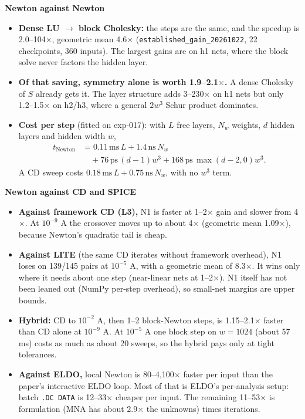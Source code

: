 \documentclass[11pt,a4paper]{article}
\begin{document}
\textbf{Newton against Newton}

\begin{itemize}
\item \textbf{Dense LU \ensuremath{\to} block Cholesky:} the steps are the same, and the
speedup is 2.0--104\ensuremath{\times}, geometric mean 4.6\ensuremath{\times}
(\nolinkurl{established_gain_20261022}, 22 checkpoints, 360 inputs). The largest gains
are on h1 nets, where the block solve never factors the hidden layer.
\item \textbf{Of that saving, symmetry alone is worth 1.9--2.1\ensuremath{\times}.} A dense
Cholesky of $S$ already gets it. The layer structure adds 3--230\ensuremath{\times} on
h1 nets but only 1.2--1.5\ensuremath{\times} on h2/h3, where a general $2w^3$ Schur
product dominates.
\item \textbf{Cost per step} (fitted on exp-017): with $L$ free layers,
$N_w$ weights, $d$ hidden layers and hidden width $w$,
\[
\begin{aligned}
t_{\mathrm{Newton}}
&=0.11\,\mathrm{ms}\,L+1.4\,\mathrm{ns}\,N_w\\
&\quad+76\,\mathrm{ps}\,(d-1)w^3
+168\,\mathrm{ps}\,\max(d-2,0)w^3.
\end{aligned}
\]
A CD sweep costs $0.18\,\mathrm{ms}\,L+0.75\,\mathrm{ns}\,N_w$,
with no $w^3$ term.
\end{itemize}

\textbf{Newton against CD and SPICE}

\begin{itemize}
\item \textbf{Against framework CD (L3),} N1 is faster at 1--2\ensuremath{\times} gain and
slower from 4\ensuremath{\times}. At $10^{-9}$ A the crossover moves up to about
4\ensuremath{\times} (geometric mean 1.09\ensuremath{\times}), because Newton's
quadratic tail is cheap.
\item \textbf{Against LITE} (the same CD iterates without framework overhead), N1 loses on
139/145 pairs at $10^{-5}$ A, with a geometric mean of 8.3\ensuremath{\times}. It wins
only where it needs about one step (near-linear nets at 1--2\ensuremath{\times}). N1
itself has not been leaned out (NumPy per-step overhead), so small-net margins are upper
bounds.
\item \textbf{Hybrid:} CD to $10^{-2}$ A, then 1--2 block-Newton steps, is
1.15--2.1\ensuremath{\times} faster than CD alone at $10^{-9}$ A. At $10^{-5}$ A one
block step on $w=1024$ (about 57 ms) costs as much as about 20 sweeps, so the hybrid
pays only at tight tolerances.
\item \textbf{Against ELDO,} local Newton is 80--4,100\ensuremath{\times} faster per input
than the paper's interactive ELDO loop. Most of that is ELDO's per-analysis setup: batch
\nolinkurl{.DC DATA} is 12--33\ensuremath{\times} cheaper per input. The remaining
11--53\ensuremath{\times} is formulation (MNA has about 2.9\ensuremath{\times} the
unknowns) times iterations.
\end{itemize}
\end{document}
